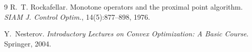 \documentclass{article}
\begin{document}
\begin{thebibliography}{9}
R.~T. Rockafellar.
\newblock Monotone operators and the proximal point algorithm.
\newblock \emph{SIAM J. Control Optim.}, 14(5):877--898, 1976.

Y.~Nesterov.
\newblock \emph{Introductory Lectures on Convex Optimization: A Basic Course}.
\newblock Springer, 2004.
\end{thebibliography}
\end{document}
